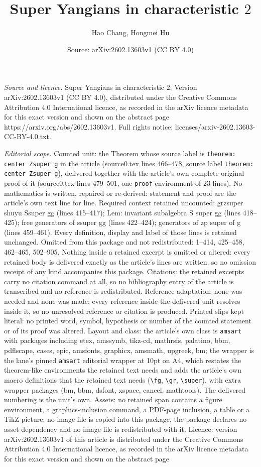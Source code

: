 \documentclass[10pt,a4paper]{amsart}
\title[Super Yangians in characteristic $2$]{Super Yangians in characteristic $2$}
\author{Hao Chang, Hongmei Hu}
\date{Source: arXiv:2602.13603v1 (CC BY 4.0)}
\begin{document}
\maketitle

\noindent\emph{Source and licence.} Super Yangians in characteristic $2$. Version arXiv:2602.13603v1 (CC BY 4.0), distributed under the Creative Commons Attribution 4.0 International licence, as recorded in the arXiv licence metadata for this exact version and shown on the abstract page https://arxiv.org/abs/2602.13603v1. Full rights notice: licenses/arxiv-2602.13603-CC-BY-4.0.txt.\par\smallskip

\noindent\textit{Editorial scope.} Counted unit: the Theorem whose source label is \texttt{theorem: center Zsuper g} in the article (source0.tex lines 466--478, source label \texttt{theorem: center Zsuper g}), delivered together with the article's own complete original proof of it (source0.tex lines 479--501, one \texttt{proof} environment of 23 lines). No mathematics is written, repaired or re-derived: statement and proof are the article's own text line for line. Required context retained uncounted: grzsuper shuyu Ssuper gg (lines 415--417); Lem: invariant subalgebra S super gg (lines 418--425); free generators of ssuper gg (lines 422--424); generators of zp super of g (lines 459--461). Every definition, display and label of those lines is retained unchanged. Omitted from this package and not redistributed: 1--414, 425--458, 462--465, 502--905. Nothing inside a retained excerpt is omitted or altered: every retained body is delivered exactly as the article's lines are written, so no omission receipt of any kind accompanies this package. Citations: the retained excerpts carry no citation command at all, so no bibliography entry of the article is transcribed and no reference is redistributed. Reference adaptation: none was needed and none was made; every reference inside the delivered unit resolves inside it, so no unresolved reference or citation is produced. Printed slips kept literal: no printed word, symbol, hypothesis or number of the counted statement or of its proof was altered. Layout and class: the article's own class is \texttt{amsart} with packages including etex, amssymb, tikz-cd, mathrsfs, palatino, bbm, pdflscape, cases, epic, amsfonts, graphicx, amsmath, upgreek, bm; the wrapper is the lane's pinned \texttt{amsart} editorial wrapper at 10pt on A4, which restates the theorem-like environments the retained text needs and adds the article's own macro definitions that the retained text needs (\texttt{\textbackslash fg}, \texttt{\textbackslash gr}, \texttt{\textbackslash super}), with extra wrapper packages (bm, bbm, dsfont, xspace, cancel, mathtools). The delivered numbering is the unit's own. Assets: no retained span contains a figure environment, a graphics-inclusion command, a PDF-page inclusion, a table or a TikZ picture; no image file is copied into this package, the package declares no asset dependency and no image file is redistributed with it. Licence: version arXiv:2602.13603v1 of this article is distributed under the Creative Commons Attribution 4.0 International licence, as recorded in the arXiv licence metadata for this exact version and shown on the abstract page 
\end{document}
